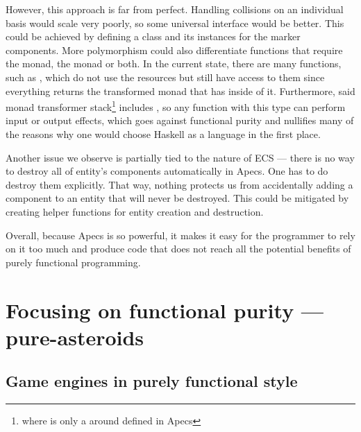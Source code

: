 \documentclass[
  digital, %
  color,   %
  table,   %
  oneside, %
  lof,     %
  lot,     %
]{fithesis3}
\begin{document}
However, this approach is far from perfect. Handling collisions on an
individual basis would scale very poorly, so some universal interface would be better.
This could be achieved by defining a class and its instances for the marker components.
More polymorphism could also differentiate functions that require the
 monad, the  monad or both.
In the current state, there are many functions, such as ,
which do not use the resources but still have access to them since
everything returns the transformed  monad
that has  inside of it. Furthermore,
said monad transformer stack\footnote{
where  is only a 
around  defined in Apecs
}
includes , so any function with this type can perform
input or output effects, which goes against functional purity and nullifies
many of the reasons why one would choose Haskell as a language in the first place.

Another issue we observe is partially tied to the nature of ECS — there
is no way to destroy all of entity's components automatically in Apecs.
One has to do destroy them explicitly. That way, nothing protects us
from accidentally adding a component to an entity that will never be destroyed.
This could be mitigated by creating helper functions for entity creation and destruction.

Overall, because Apecs is so powerful, it makes it easy for the programmer to rely
on it too much and produce code that does not reach all the potential
benefits of purely functional programming.




\chapter{Focusing on functional purity --- pure-asteroids}
\label{chptr:purity}

\section{Game engines in purely functional style}
\label{sect:pureengines}
\end{document}
